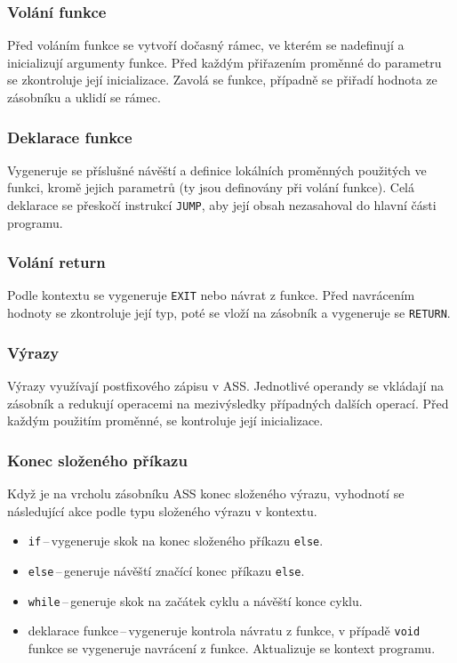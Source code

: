 \documentclass[a4paper, 12pt]{article}
\begin{document}
    \subsubsection{Volání funkce}
    Před voláním funkce se vytvoří dočasný rámec, ve kterém se nadefinují a inicializují argumenty funkce. Před každým přiřazením proměnné do parametru se zkontroluje její inicializace. Zavolá se funkce, případně se přiřadí hodnota ze zásobníku a uklidí se rámec.

    \subsubsection{Deklarace funkce}
    Vygeneruje se příslušné návěští a definice lokálních proměnných použitých ve funkci, kromě jejich parametrů (ty jsou definovány při volání funkce). Celá deklarace se přeskočí instrukcí \texttt{JUMP}, aby její obsah nezasahoval do hlavní části programu.

    \subsubsection{Volání return}
    Podle kontextu se vygeneruje \texttt{EXIT} nebo návrat z funkce. Před navrácením hodnoty se zkontroluje její typ, poté se vloží na zásobník a vygeneruje se \texttt{RETURN}.

    \subsubsection{Výrazy}
    Výrazy využívají postfixového zápisu v ASS. Jednotlivé operandy se vkládají na zásobník a redukují operacemi na mezivýsledky případných dalších operací. Před každým použitím proměnné, se kontroluje její inicializace.

    \subsubsection{Konec složeného příkazu} \label{konec slozeneho}
    Když je na vrcholu zásobníku ASS konec složeného výrazu, vyhodnotí se následující akce podle typu složeného výrazu v kontextu.
    \begin{itemize}
        \item \texttt{if}\,--\,vygeneruje skok na konec složeného příkazu \texttt{else}.
        \item \texttt{else}\,--\,generuje návěští značící konec příkazu \texttt{else}.
        \item \texttt{while}\,--\,generuje skok na začátek cyklu a návěští konce cyklu.
        \item deklarace funkce\,--\,vygeneruje kontrola návratu z funkce, v případě \texttt{void} funkce se vygeneruje navrácení z funkce. Aktualizuje se kontext programu.
    \end{itemize}
\end{document}
